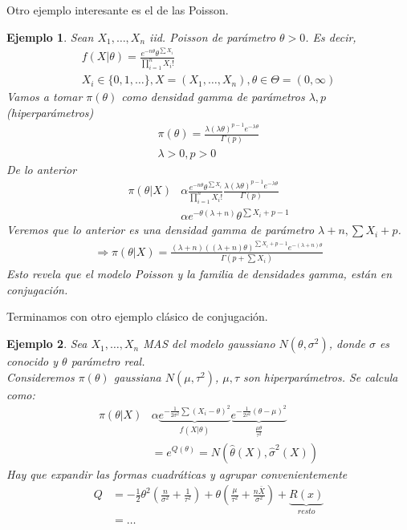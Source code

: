 \documentclass[10pt]{article}
\theoremstyle{plain}
\newtheorem{ej}{Ejemplo}
\theoremstyle{definition}
\begin{document}
Otro ejemplo interesante es el de las Poisson.
\begin{ej}
Sean $X_{1},\ldots,X_{n}$ iid. Poisson de parámetro $\theta>0$. Es decir,
\begin{align*}
f(X|\theta) = \frac{e^{-n\theta}\theta^{\sum X_{i}}}{\prod_{i=1}^{n}X_{i}!}\\
X_{i} \in \{0,1,\ldots\}, X = (X_{1},\ldots,X_{n}), \theta \in \Theta = (0,\infty)
\end{align*}
Vamos a tomar $\pi(\theta)$ como densidad gamma de parámetros $\lambda, p$ (hiperparámetros)
\begin{align*}
\pi(\theta) = \frac{\lambda (\lambda\theta)^{p-1}e^{-\lambda\theta}}{\Gamma(p)}\\
\lambda>0, p>0
\end{align*}
De lo anterior
\begin{align*}
\pi(\theta|X) &\alpha \frac{e^{-n\theta}\theta^{\sum X_{i}}}{\prod_{i=1}^n X_{i}!} \frac{\lambda (\lambda\theta)^{p-1}e^{-\lambda\theta}}{\Gamma(p)}\\
&\alpha e^{-\theta(\lambda+n)}\theta^{\sum X_{i}+p-1}
\end{align*}
Veremos que lo anterior es una densidad gamma de parámetro $\lambda+n,\sum X_{i} + p$.\\
\begin{align*}
\Rightarrow \pi(\theta|X) = \frac{(\lambda+n)((\lambda+n)\theta)^{\sum X_{i} + p - 1}e^{-(\lambda+n)\theta}}{\Gamma(p+\sum X_{i})}
\end{align*}
Esto revela que el modelo Poisson y la familia de densidades gamma, están en conjugación.
\end{ej}
Terminamos con otro ejemplo clásico de conjugación.
\begin{ej}
Sea $X_{1},\ldots,X_{n}$ MAS del modelo gaussiano $N(\theta,\sigma^2)$, donde $\sigma$ es conocido y $\theta$ parámetro real.\\
Consideremos $\pi(\theta)$ gaussiana $N(\mu,\tau^2)$, $\mu,\tau$ son hiperparámetros. Se calcula como:
\begin{align*}
\pi(\theta|X) &\alpha \underbrace{e^{-\frac{1}{2\sigma^2}\sum (X_{i}-\theta)^{2}}}_{f(X|\theta)}\underbrace{e^{-\frac{1}{2\tau^2}(\theta-\mu)^2}}_{\frac{\mu \theta}{\tau^2}}\\
&= e^{Q(\theta)} = N(\hat{\theta}(X),\hat{\sigma}^2(X))
\end{align*}
Hay que expandir las formas cuadráticas y agrupar convenientemente
\begin{align*}
Q &= -\frac{1}{2}\theta^2\left(\frac{n}{\sigma^2}+\frac{1}{\tau^2}\right) + \theta \left(\frac{\mu}{\tau^2}+\frac{n\bar{X}}{\sigma^2}\right) + \underbrace{R(x)}_{resto}\\
&= \ldots
\end{align*}
\end{ej}
\end{document}
